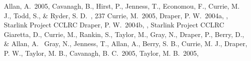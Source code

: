 \documentclass[11pt,twoside]{article}  %
\begin{document}
\begin{references}

 Allan, A.\ 2005, \adassxiv {}
 Cavanagh, B., Hirst, P., Jenness, T., Economou, F., Currie, M. J.,
Todd, S., \& Ryder, S.  D.\ \adassxii, 237
 Currie, M.\ 2005, \adassxiv {}
 Draper, P. W.\  2004a, 
,
Starlink Project CCLRC
 Draper, P. W.\  2004b,
,
Starlink Project CCLRC
 Giaretta, D., Currie, M., Rankin, S., Taylor, M., Gray, N.,
Draper, P., Berry, D., \& Allan, A.\ \adassxiv {}
 Gray, N., Jenness, T., Allan, A., Berry, S. B., Currie, M. J.,
Draper, P. W., Taylor, M. B., Cavanagh, B. C.\ 2005, \adassxiv {}
 Taylor, M. B.\ 2005, \adassxiv {}


\end{references}

\end{document}
